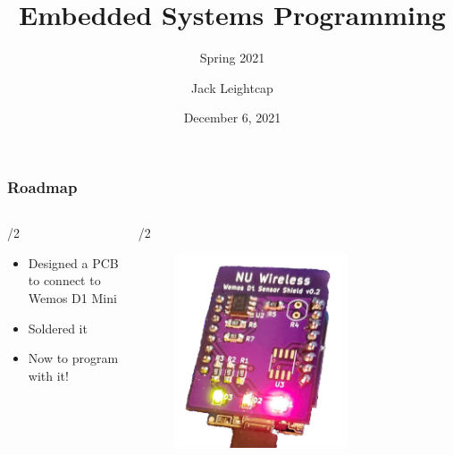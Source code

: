 \documentclass{beamer} \usetheme{Madrid}
\title{Embedded Systems Programming}
\subtitle{Spring 2021}
\author[]{Jack Leightcap\inst{1}\inst{2}}
\institute[IEEE, Wireless Club]{
	\inst{1}IEEE -- \url{nuieeeofficers@gmail.com}
	\and
	\inst{2}Wireless Club -- \url{nuwirelessclub@gmail.com}
}
\date[Spring 2021]{December 6, 2021}
\begin{document}
\frame{\titlepage}

\begin{frame}
	\frametitle{Roadmap}
	\begin{columns}[t]
		\begin{column}{{\textwidth}/2}
			\begin{itemize}
				\item Designed a PCB to connect to Wemos D1 Mini
				\item Soldered it
				\item Now to program with it!
			\end{itemize}
		\end{column}
		\begin{column}{{\textwidth}/2}
			\begin{figure}[H]
				\centering
				\includegraphics[width=0.7\textwidth]{board.jpeg}
			\end{figure}
		\end{column}
	\end{columns}
\end{frame}
\end{document}
